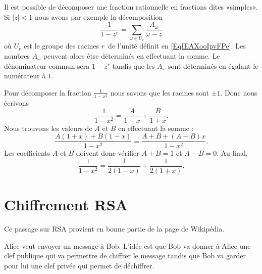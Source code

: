 Il est possible de décomposer une fraction rationnelle en fractions dites «simples». Si \( | z |<1\) nous avons par exemple la décomposition
\begin{equation}        \label{EqDWYBooJIMBAt}
    \frac{1}{ 1-z^r }=\sum_{\omega\in U_r}\frac{ A_{\omega} }{ \omega-z }
\end{equation}
où \( U_r\) est le groupe des racines \( r\)\ieme\ de l'unité définit en \eqref{EqIEAXooIpvFPe}. Les nombres \( A_{\omega}\) peuvent alors être déterminés en effectuant la somme. Le dénominateur commun sera \( 1-z^r\) tandis que les \( A_{\omega}\) sont déterminés en égalant le numérateur à \( 1\).

\begin{example}
    Pour décomposer la fraction \( \frac{1}{ 1-x^2 }\) nous savons que les racines sont \( \pm 1\). Donc nous écrivons
    \begin{equation}
        \frac{1}{ 1-x^2 }=\frac{ A }{ 1-x }+\frac{ B }{ 1+x }.
    \end{equation}
    Nous trouvons les valeurs de \( A\) et \( B\) en effectuant la somme :
    \begin{equation}
        \frac{ A(1+x)+B(1-x) }{ 1-x^2 }=\frac{ A+B+(A-B)x }{ 1-x^2 }.
    \end{equation}
    Les coefficients \( A\) et \( B\) doivent donc vérifier \( A+B=1\) et \( A-B=0\). Au final,
    \begin{equation}
        \frac{1}{ 1-x^2 }=\frac{1}{ 2(1-x) }+\frac{1}{ 2(1+x) }.
    \end{equation}
\end{example}

\section{Chiffrement RSA}
\label{SecEVaFYi}

Ce passage sur RSA provient en bonne partie de la page de Wikipédia\cite{ooRIFDooNxOehF}.

Alice veut envoyer un message à Bob. L'idée est que Bob va donner à Alice une clef publique qui va permettre de chiffrer le message tandis que Bob va garder pour lui une clef privée qui permet de déchiffrer.

